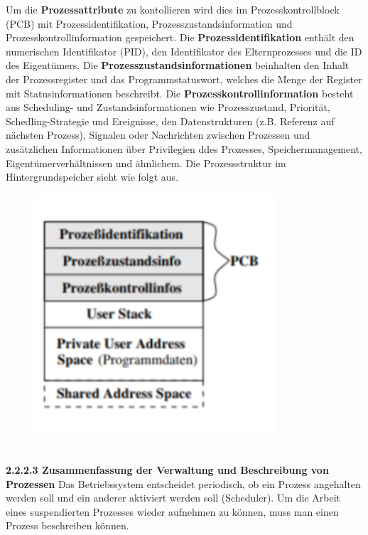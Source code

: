 \documentclass{article}
\begin{document}
    Um die \textbf{Prozessattribute} zu kontollieren wird dies im Prozesskontrollblock (PCB) mit Prozessidentifikation, Prozesszustandsinformation und Prozesskontrollinformation gespeichert. Die \textbf{Prozessidentifikation} enthält den numerischen Identifikator (PID), den Identifikator des Elternprozesses und die ID des Eigentümers. Die \textbf{Prozesszustandsinformationen} beinhalten den Inhalt der Prozessregister und das Programmstatuswort, welches die Menge der Register mit Statusinformationen beschreibt. Die \textbf{Prozesskontrollinformation} besteht aus Scheduling- und Zustandsinformationen wie Prozesszustand, Priorität, Schedling-Strategie und Ereignisse, den Datenstrukturen (z.B. Referenz auf nächsten Prozess), Signalen oder Nachrichten zwischen Prozessen und zusätzlichen Informationen über Privilegien ddes Prozesses, Speichermanagement,  Eigentümerverhältnissen und ähnlichem.\newline
    Die Prozessstruktur im Hintergrundspeicher sieht wie folgt aus.\newline
    \begin{figure}[h]
        \centering
	    \includegraphics[width=90mm]{Skizzen/2_Kapitel/Prozessstruktur_im_Hintergrundspeicher.png}
    \end{figure}
    \\
    \textbf{2.2.2.3 Zusammenfassung der Verwaltung und Beschreibung von Prozessen}\newline
    Das Betriebssystem entscheidet periodisch, ob ein Prozess angehalten werden soll und ein anderer aktiviert werden soll (Scheduler). Um die Arbeit eines suspendierten Prozesses wieder aufnehmen zu können, muss man einen Prozess beschreiben können.
\end{document}
